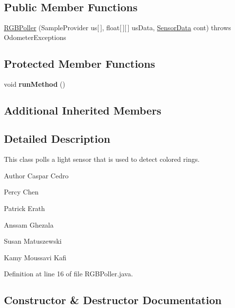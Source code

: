 \subsection*{Public Member Functions}
\begin{DoxyCompactItemize}
\item 
\hyperlink{classca_1_1mcgill_1_1ecse211_1_1threads_1_1_r_g_b_poller_a7e23e2fe527b2ecbf4ddc8f988dd70a5}{R\+G\+B\+Poller} (Sample\+Provider us\mbox{[}$\,$\mbox{]}, float\mbox{[}$\,$\mbox{]}\mbox{[}$\,$\mbox{]} us\+Data, \hyperlink{classca_1_1mcgill_1_1ecse211_1_1threads_1_1_sensor_data}{Sensor\+Data} cont)  throws Odometer\+Exceptions 
\end{DoxyCompactItemize}
\subsection*{Protected Member Functions}
\begin{DoxyCompactItemize}
\item 
\mbox{\label{classca_1_1mcgill_1_1ecse211_1_1threads_1_1_r_g_b_poller_a96db4561c87136de5098497fe30356fe}} 
void {\bfseries run\+Method} ()
\end{DoxyCompactItemize}
\subsection*{Additional Inherited Members}


\subsection{Detailed Description}
This class polls a light sensor that is used to detect colored rings.

\begin{DoxyAuthor}{Author}
Caspar Cedro 

Percy Chen 

Patrick Erath 

Anssam Ghezala 

Susan Matuszewski 

Kamy Moussavi Kafi 
\end{DoxyAuthor}


Definition at line 16 of file R\+G\+B\+Poller.\+java.



\subsection{Constructor \& Destructor Documentation}
\mbox{\label{classca_1_1mcgill_1_1ecse211_1_1threads_1_1_r_g_b_poller_a7e23e2fe527b2ecbf4ddc8f988dd70a5}} 
